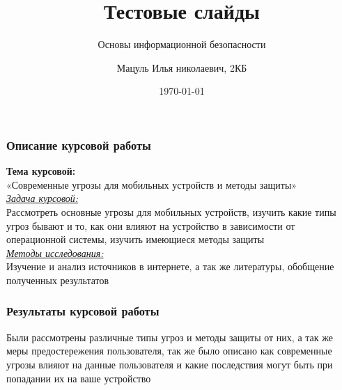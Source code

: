 \documentclass{beamer}
\title{Тестовые слайды}
\subtitle{Основы информационной безопасности}
\author{Мацуль Илья николаевич, 2КБ}
\date{\today}
\institute{БФУ им. И.Канта}
\begin{document}
\begin{frame}
\titlepage
\end{frame}

\begin{frame}
\frametitle{Описание курсовой работы}
	\begin{center}
		
\textbf{Тема курсовой:}\\
«Современные угрозы для мобильных устройств и методы защиты»\\

\underline{\textit{Задача курсовой:}}\\
Рассмотреть основные угрозы для мобильных устройств, изучить какие типы угроз бывают и то, как они влияют на устройство в зависимости от операционной системы, изучить имеющиеся методы защиты\\

\underline{\textit{Методы исследования:}}\\
Изучение и анализ источников в интернете, а так же литературы, обобщение полученных результатов

	\end{center}
\end{frame}

\begin{frame}
\frametitle{Результаты курсовой работы}
Были рассмотрены различные типы угроз и методы защиты от них, а так же меры предостережения пользователя, так же было описано как современные угрозы влияют на данные пользователя и какие последствия могут быть при попадании их на ваше устройство
\end{frame}
\end{document}
